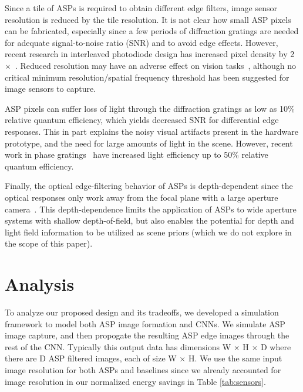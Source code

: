 \documentclass[10pt,twocolumn,letterpaper]{article}
\newcommand{\Section}[1]{\vspace{-4pt}\section{#1}\vspace{-4pt}}
\newcommand{\Subsection}[1]{\vspace{-3pt}\subsection{#1}\vspace{-3pt}}
\begin{document}
Since a tile of ASPs is required to obtain different edge filters, image sensor resolution is reduced by the tile resolution. It is not clear how small ASP pixels can be fabricated, especially since a few periods of diffraction gratings are needed for adequate signal-to-noise ratio (SNR) and to avoid edge effects. However, recent research in interleaved photodiode design has increased pixel density by 2$\times$~\cite{sivaramakrishnan2016design, sivaramakrishnan2011enhanced}. Reduced resolution may have an adverse effect on vision tasks~\cite{dai2015useful}, although no critical minimum resolution/spatial frequency threshold has been suggested for image sensors to capture.

ASP pixels can suffer loss of light through the diffraction gratings as low as 10\% relative quantum efficiency, which yields decreased SNR for differential edge responses. This in part explains the noisy visual artifacts present in the hardware prototype, and the need for large amounts of light in the scene. However, recent work in phase gratings~\cite{sivaramakrishnan2016design, sivaramakrishnan2011enhanced} have increased light efficiency up to 50\% relative quantum efficiency.

Finally, the optical edge-filtering behavior of ASPs is depth-dependent since the optical responses only work away from the focal plane with a large aperture camera~\cite{wang2012light}. This depth-dependence limits the application of ASPs to wide aperture systems with shallow depth-of-field, but also enables the potential for depth and light field information to be utilized as scene priors (which we do not explore in the scope of this paper).








%	



\Section{Analysis}
	To analyze our proposed design and its tradeoffs, we developed a simulation framework to model both ASP image formation and CNNs. We simulate ASP image capture, and then propogate the resulting ASP edge images through the rest of the CNN. Typically this output data has dimensions W $\times$ H $\times$ D where there are D ASP filtered images, each of size W $\times$ H. We use the same input image resolution for both ASPs and baselines since we already accounted for image resolution in our normalized energy savings in Table \ref{tab:sensors}.
\end{document}
